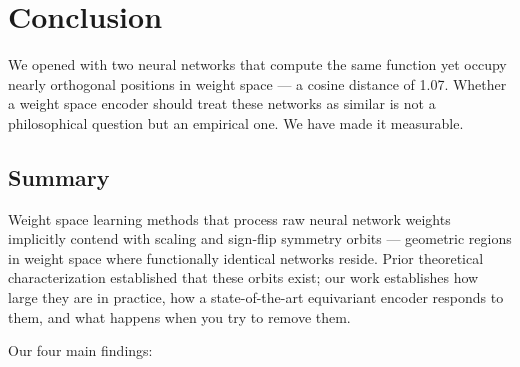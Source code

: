 \section{Conclusion}
\label{sec:conclusion}

We opened with two neural networks that compute the same function yet occupy nearly orthogonal positions in weight space --- a cosine distance of 1.07. Whether a weight space encoder should treat these networks as similar is not a philosophical question but an empirical one. We have made it measurable.

\subsection*{Summary}

Weight space learning methods that process raw neural network weights implicitly contend with scaling and sign-flip symmetry orbits --- geometric regions in weight space where functionally identical networks reside. Prior theoretical characterization established that these orbits exist; our work establishes how large they are in practice, how a state-of-the-art equivariant encoder responds to them, and what happens when you try to remove them.

Our four main findings:

